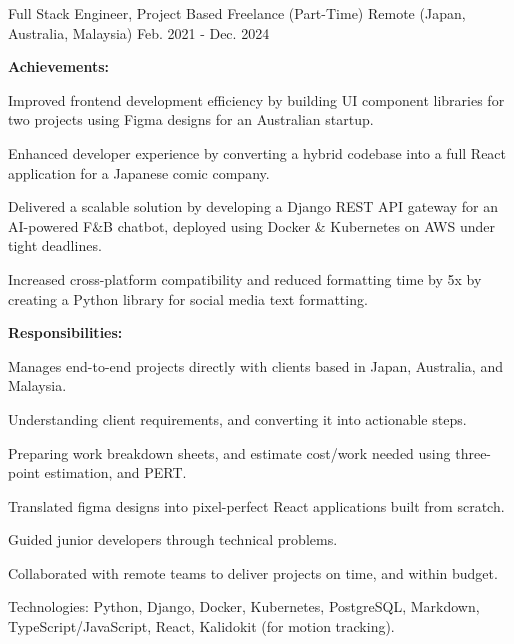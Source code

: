 

\begin{cventries}


  \cventry
    {Full Stack Engineer, Project Based} %
    {Freelance (Part-Time)} %
    {Remote (Japan, Australia, Malaysia)} %
    {Feb. 2021 - Dec. 2024} %
    {
      \textbf{Achievements:}
      \vspace{1.5em}
      \begin{cvitems} %
        \item {Improved frontend development efficiency by building UI component libraries for two projects using Figma designs for an Australian startup.}
        \item {Enhanced developer experience by converting a hybrid codebase into a full React application for a Japanese comic company.}
        \item {Delivered a scalable solution by developing a Django REST API gateway for an AI-powered F\&B chatbot, deployed using Docker \& Kubernetes on AWS under tight deadlines.}
        \item {Increased cross-platform compatibility and reduced formatting time by 5x by creating a Python library for social media text formatting.}
      \end{cvitems}
      \vspace{1.5em}
      \textbf{Responsibilities:}
      \vspace{1.5em}
      \begin{cvitems} %
        \item {Manages end-to-end projects directly with clients based in Japan, Australia, and Malaysia.}
        \item {Understanding client requirements, and converting it into actionable steps.}
        \item {Preparing work breakdown sheets, and estimate cost/work needed using three-point estimation, and PERT.}
        \item {Translated figma designs into pixel-perfect React applications built from scratch.}
        \item {Guided junior developers through technical problems.}
        \item {Collaborated with remote teams to deliver projects on time, and within budget.}
        \item {Technologies: Python, Django, Docker, Kubernetes, PostgreSQL, Markdown, TypeScript/JavaScript, React, Kalidokit (for motion tracking).}
      \end{cvitems}
    }


\end{cventries}
